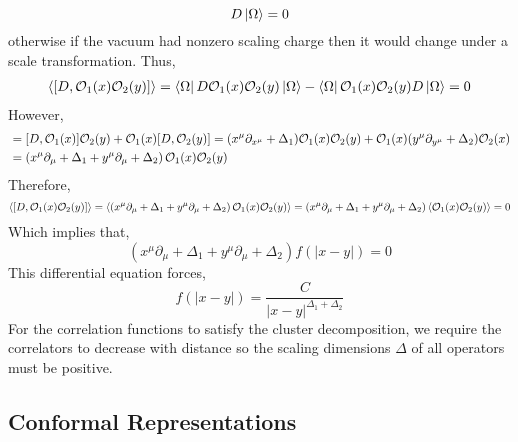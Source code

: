 \documentclass[12pt]{extarticle}
\begin{document}
\[ D \left| \Omega \right> = 0 \]
otherwise if the vacuum had nonzero scaling charge then it would change under a scale transformation. Thus,
\begin{align*}
\left< [D, \mathcal{O}_1(x) \mathcal{O}_2(y)] \right> = \left< \Omega \right| D \mathcal{O}_1(x) \mathcal{O}_2(y) \left| \Omega \right> - \left< \Omega \right| \mathcal{O}_1(x) \mathcal{O}_2(y) D \left| \Omega \right> = 0
\end{align*}
However,
\begin{align*}
[D, \Op_1(x) \Op_2(y)] & = [D, \Op_1(x)] \Op_2(y) + \Op_1(x) [D, \Op_2(y)] = (x^\mu \partial_{x^\mu} + \Delta_1) \Op_1(x) \Op_2(y) + \Op_1(x) (y^\mu \partial_{y^\mu} + \Delta_2) \Op_2(x) 
\\
& = \left( x^\mu \partial_\mu + \Delta_1 + y^\mu \partial_\mu + \Delta_2 \right) \Op_1(x) \Op_2(y) 
\end{align*}
Therefore,
\[ \left< [D, \mathcal{O}_1(x) \mathcal{O}_2(y)] \right> = \left< \left( x^\mu \partial_\mu + \Delta_1 + y^\mu \partial_\mu + \Delta_2 \right) \mathcal{O}_1(x) \mathcal{O}_2(y) \right> = \left( x^\mu \partial_\mu + \Delta_1 + y^\mu \partial_\mu + \Delta_2 \right) \left< \mathcal{O}_1(x) \mathcal{O}_2(y) \right> = 0 \] 
Which implies that,
\[ \left( x^\mu \partial_\mu + \Delta_1 + y^\mu \partial_\mu + \Delta_2 \right) f(|x - y|) = 0 \]
This differential equation forces,
\[ f(|x - y|) = \frac{C}{|x - y|^{\Delta_1 + \Delta_2}} \]
For the correlation functions to satisfy the cluster decomposition, we require the correlators to decrease with distance so the scaling dimensions $\Delta$ of all operators must be positive.  

\subsection{Conformal Representations}
\newcommand{\ad}[1]{\mathrm{ad}_{#1}}
\end{document}
